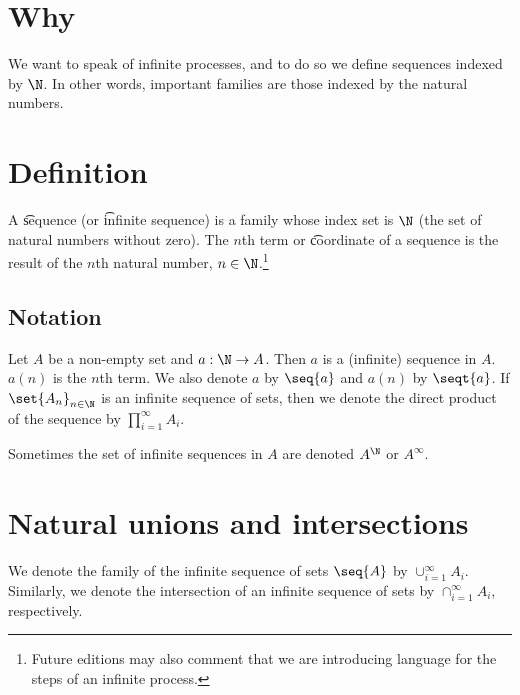 
\section*{Why}

We want to speak of infinite processes, and to do so we define sequences indexed by $\N  $.
In other words, important families are those indexed by the natural numbers.

\section*{Definition}

A \t{sequence} (or \t{infinite sequence}) is a family whose index set is $\N  $ (the set of natural numbers without zero).
The \t{$n$th term} or \t{coordinate} of a sequence is the result of the $n$th natural number, $n \in \N  $.\footnote{Future editions may also comment that we are introducing language for the steps of an infinite process.}

\subsection*{Notation}

Let $A$ be a non-empty set and $a: \N   \to A$.
Then $a$ is a (infinite) sequence in $A$.
$a(n)$ is the $n$th term.
We also denote $a$ by $\seq{a}$ and $a(n)$ by $\seqt{a}$.
If $\set{A_n}_{n \in \N  }$ is an infinite sequence of sets, then we denote the direct product of the sequence by $\prod_{i = 1}^{\infty} A_i$.

Sometimes the set of infinite sequences in $A$ are denoted $A^\N  $ or $A^\infty$.

\section*{Natural unions and intersections}

We denote the family of the infinite sequence of sets $\seq{A}$ by $\cup_{i = 1}^{\infty} A_i$.
Similarly, we denote the intersection of an infinite sequence of sets by $\cap _{i = 1}^{\infty} A_i$, respectively.

\blankpage

